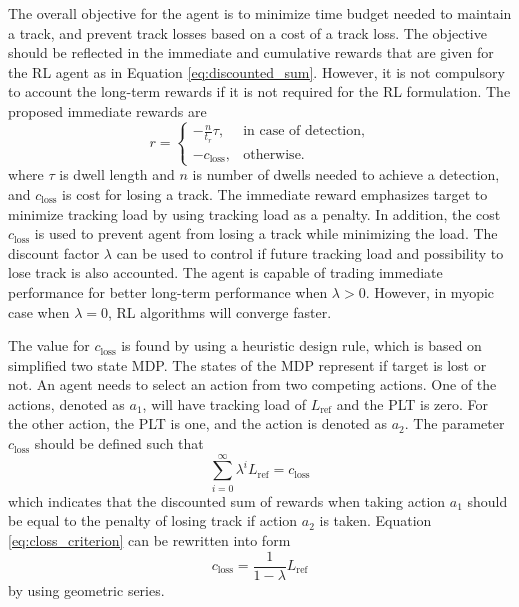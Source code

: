 \documentclass[english, 12pt, a4paper, elec, utf8, a-1b, online]{aaltothesis}
\newcommand{\closs}{c_\text{loss}}
\newcommand{\ri}{t_r}
\begin{document}
\newcommand{\ploss}{P_\text{loss}}

\newcommand{\pref}{P_\text{ref}}
\newcommand{\lref}{L_\text{ref}}

The overall objective for the agent is to minimize time budget needed to maintain a track, and prevent track losses based on a cost of a track loss.
The objective should be reflected in the immediate and cumulative rewards that are given for the RL agent as in Equation \ref{eq:discounted_sum}. 
However, it is not compulsory to account the long-term rewards if it is not required for the RL formulation.
The proposed immediate rewards are
\begin{equation}
    r = \left\{
    \begin{array}{ll}
        -\frac{n}{\ri} \tau, & \text{in case of detection,}\\
        -\closs, & \text{otherwise}.
    \end{array} \right.
\end{equation}
where $\tau$ is dwell length and $n$ is number of dwells needed to achieve a detection, and $\closs$ is cost for losing a track.
The immediate reward emphasizes target to minimize tracking load by using tracking load as a penalty.
In addition, the cost $\closs$ is used to prevent agent from losing a track while minimizing the load.
The discount factor $\lambda$ can be used to control if future tracking load and possibility to lose track is also accounted.
The agent is capable of trading immediate performance for better long-term performance when $\lambda > 0$.
However, in myopic case when $\lambda = 0$, RL algorithms will converge faster.

The value for $\closs$ is found by using a heuristic design rule, which is based on simplified two state MDP.
The states of the MDP represent if target is lost or not.
An agent needs to select an action from two competing actions.
One of the actions, denoted as $a_1$, will have tracking load of $\lref$ and the PLT is zero.
For the other action, the PLT is one, and the action is denoted as $a_2$.
The parameter $\closs$ should be defined such that
\begin{equation}\label{eq:closs_criterion}
    \sum_{i=0}^\infty \lambda^i \lref = \closs
\end{equation}
which indicates that the discounted sum of rewards when taking action $a_1$ should be equal to the penalty of losing track if action $a_2$ is taken.
Equation \eqref{eq:closs_criterion} can be rewritten into form
\begin{equation}
    \closs = \frac{1}{1-\lambda} \lref
\end{equation}
 by using geometric series.
\end{document}
